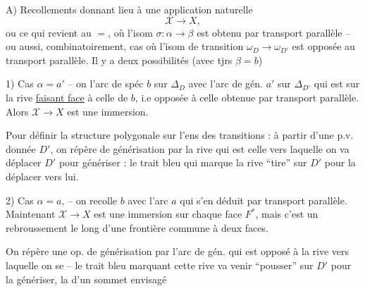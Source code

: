 A) Recollements donnant lieu à une application naturelle
\[
\mathscr X\longrightarrow X,
\]
ou ce qui revient au $=$, où l'isom $\sigma:\alpha\longrightarrow\beta$  est obtenu par transport parallèle -- ou aussi, combinatoirement, cas où l'isom de transition $\omega_D\longrightarrow\omega_{D'}$ est opposée au transport parallèle. Il y a deux possibilités (avec tjrs $\beta=b$)

1) Cas $\alpha=a'$ -- on    l'arc de spéc $b$ sur $\Delta_D$ avec l'arc  de gén. $a'$ sur $\Delta_{D'}$ qui est sur la rive \uline{faisant face} à celle de $b$, i.e opposée à celle obtenue par transport parallèle.  Alors $\mathscr X\to X$ est une immersion. 

 Pour définir la structure polygonale sur l'ens des transitions : à partir d'une p.v. donnée $D'$, on répère   de générisation par la rive qui est  celle vers laquelle on va déplacer $D'$ pour génériser : le trait bleu qui marque la rive ``tire'' sur $D'$ pour la déplacer vers lui.

2) Cas $\alpha=a$, -- on recolle $b$ avec l'arc $a$ qui s'en déduit par transport parallèle. Maintenant $\mathscr X\to X$ est une immersion sur chaque face $F^*$, mais c'est un rebroussement le long d'une frontière commune à deux faces.

On répère une op. de générisation par  l'arc de gén. qui est opposé à la rive vers laquelle on se  -- le trait bleu marquant cette rive va venir ``pousser'' sur $D'$ pour la génériser,  la  d'un sommet envisagé
